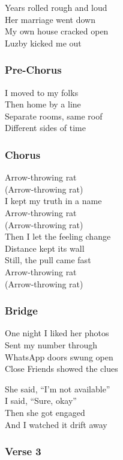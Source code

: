 Years rolled rough and loud\\
Her marriage went down\\
My own house cracked open\\
Luzby kicked me out

\subsubsection{Pre-Chorus}\label{pre-chorus-30}

I moved to my folks\\
Then home by a line\\
Separate rooms, same roof\\
Different sides of time

\subsubsection{Chorus}\label{chorus-49}

Arrow-throwing rat\\
(Arrow-throwing rat)\\
I kept my truth in a name\\
Arrow-throwing rat\\
(Arrow-throwing rat)\\
Then I let the feeling change\\
Distance kept its wall\\
Still, the pull came fast\\
Arrow-throwing rat\\
(Arrow-throwing rat)

\subsubsection{Bridge}\label{bridge-18}

One night I liked her photos\\
Sent my number through\\
WhatsApp doors swung open\\
Close Friends showed the clues

She said, ``I'm not available''\\
I said, ``Sure, okay''\\
Then she got engaged\\
And I watched it drift away

\subsubsection{Verse 3}\label{verse-3-10}

